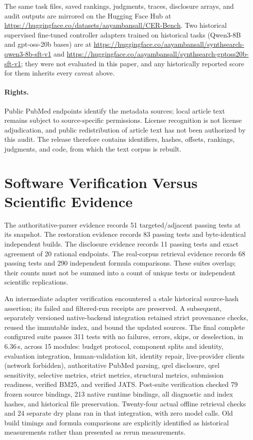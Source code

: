 The same task files, saved rankings, judgments, traces, disclosure arrays, and audit outputs are mirrored on the Hugging Face Hub at \url{https://huggingface.co/datasets/aayambansall/CER-Bench}. Two historical supervised fine-tuned controller adapters trained on historical tasks (Qwen3-8B and gpt-oss-20b bases) are at \url{https://huggingface.co/aayambansall/synthsearch-qwen3-8b-sft-v1} and \url{https://huggingface.co/aayambansall/synthsearch-gptoss20b-sft-v1}; they were not evaluated in this paper, and any historically reported score for them inherits every caveat above.
\fi

\paragraph{Rights.}
Public PubMed endpoints identify the metadata sources; local article text remains subject to source-specific permissions. License recognition is not license adjudication, and public redistribution of article text has not been authorized by this audit. The release therefore contains identifiers, hashes, offsets, rankings, judgments, and code, from which the text corpus is rebuilt.

\section{Software Verification Versus Scientific Evidence}
\label{app:tests}
The authoritative-parser evidence records 51 targeted/adjacent passing tests at its snapshot. The restoration evidence records 83 passing tests and byte-identical independent builds. The disclosure evidence records 11 passing tests and exact agreement of 20 rational endpoints. The real-corpus retrieval evidence records 68 passing tests and 290 independent formula comparisons. These suites overlap; their counts must not be summed into a count of unique tests or independent scientific replications.

An intermediate adapter verification encountered a stale historical source-hash assertion; its failed and filtered-run receipts are preserved. A subsequent, separately versioned native-backend integration retained strict provenance checks, reused the immutable index, and bound the updated sources. The final complete configured suite passes 311 tests with no failures, errors, skips, or deselection, in 6.36\,s, across 15 modules: budget protocol, component splits and identity, evaluation integration, human-validation kit, identity repair, live-provider clients (network forbidden), authoritative PubMed parsing, qrel disclosure, qrel sensitivity, selective metrics, strict metrics, structural metrics, submission readiness, verified BM25, and verified JATS. Post-suite verification checked 79 frozen source bindings, 213 native runtime bindings, all diagnostic and index hashes, and historical file preservation. Twenty-four actual offline retrieval checks and 24 separate dry plans ran in that integration, with zero model calls. Old build timings and formula comparisons are explicitly identified as historical measurements rather than presented as rerun measurements.

